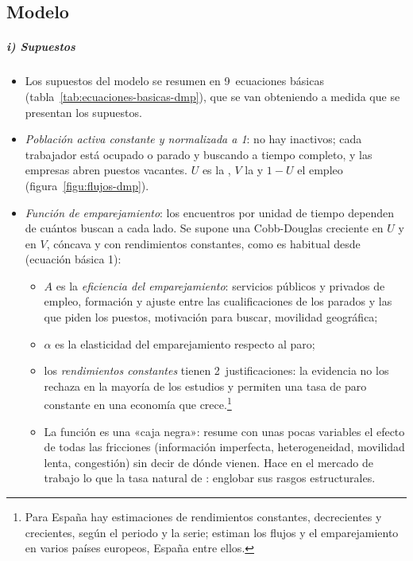 \documentclass[11pt]{article}
\begin{document}
\subsection{Modelo}\label{sec:dmp-modelo}

\subparagraph{i) Supuestos}

\begin{itemize}
\item Los supuestos del modelo se resumen en 9~ecuaciones básicas (tabla~\ref{tab:ecuaciones-basicas-dmp}), que se van obteniendo a medida que se presentan los supuestos.
\item \emph{Población activa constante y normalizada a 1}: no hay inactivos; cada trabajador está ocupado o parado y buscando a tiempo completo, y las empresas abren puestos vacantes. $U$ es la , $V$ la  y $1-U$ el empleo (figura~\ref{figu:flujos-dmp}).
\item \emph{Función de emparejamiento}: los encuentros por unidad de tiempo dependen de cuántos buscan a cada lado. Se supone una Cobb-Douglas creciente en $U$ y en $V$, cóncava y con rendimientos constantes, como es habitual desde \textcite[cap.~1]{Pissarides2000Equilibrium} (ecuación básica 1):
  \begin{itemize}
  \item $A$ es la \emph{eficiencia del emparejamiento}: servicios públicos y privados de empleo, formación y ajuste entre las cualificaciones de los parados y las que piden los puestos, motivación para buscar, movilidad geográfica;
  \item $\alpha$ es la elasticidad del emparejamiento respecto al paro;
  \item los \emph{rendimientos constantes} tienen 2~justificaciones: la evidencia no los rechaza en la mayoría de los estudios\nocite{PetrongoloPissarides2001Black} y permiten una tasa de paro constante en una economía que crece.\footnote{Para España hay estimaciones de rendimientos constantes, decrecientes y crecientes, según el periodo y la serie\nocite{NunezUsabiaga2007}; \textcite{BurdaWyplosz1994Gross} estiman los flujos y el emparejamiento en varios países europeos, España entre ellos.}
  \item La función es una «caja negra»: resume con unas pocas variables el efecto de todas las fricciones (información imperfecta, heterogeneidad, movilidad lenta, congestión) sin decir de dónde vienen\nocite{PetrongoloPissarides2001Black}. Hace en el mercado de trabajo lo que la tasa natural de \textcite{Friedman1968Role}: englobar sus rasgos estructurales.

\end{itemize}
\end{itemize}
\end{document}
